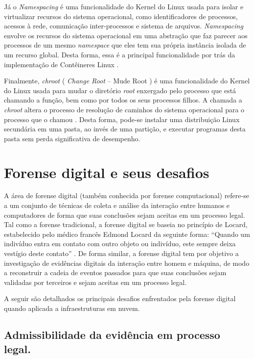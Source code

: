 Já o \textit{Namespacing} é uma funcionalidade do Kernel do Linux usada para isolar e virtualizar recursos do sistema operacional, como identificadores de processos, acessos à rede, comunicação inter-processos e sistema de arquivos.
%
\textit{Namespacing} envolve os recursos do sistema operacional em uma abstração que faz parecer aos processos de um mesmo \textit{namespace} que eles tem sua própria instância isolada de um recurso global.
%
Desta forma, essa é a principal funcionalidade por trás da implementação de Contêineres Linux \cite{UnixManPagesNamespacing}.


Finalmente, \textit{chroot} ( \textit{Change Root} -- Mude Root ) é uma funcionalidade do Kernel do Linux usada para mudar o diretório \textit{root} enxergado pelo processo que está chamando a função, bem como por todos os seus processos filhos. 
%
A chamada a \textit{chroot} altera o processo de resolução de caminhos do sistema operacional para o processo que o chamou \cite{UnixManPagesChRoot}.
%
Desta forma, pode-se instalar uma distribuição Linux secundária em uma pasta, ao invés de uma partição, e executar programas desta pasta sem perda significativa de desempenho.


\section{Forense digital e seus desafios}
\label{sec:forensedigital}


A área de forense digital (também conhecida por forense computacional) refere-se a um conjunto de técnicas de coleta e análise da interação entre humanos e computadores de forma que suas conclusões sejam aceitas em um processo legal.
%
Tal como a forense tradicional, a forense digital se baseia no princípio de Locard, estabelecido pelo médico francês Edmond Locard da seguinte forma: ``Quando um indivíduo entra em contato com outro objeto ou indivíduo, este sempre deixa vestígio deste contato'' \cite{Ramos:2011}.
%
De forma similar, a forense digital tem por objetivo a investigação de evidências digitais da interação entre homem e máquina, de modo a reconstruir a cadeia de eventos passados para que suas conclusões sejam validadas por terceiros e sejam aceitas em um processo legal.
 

A seguir são detalhados os principais desafios enfrentados pela forense digital quando aplicada a infraestruturas em nuvem.

\subsection{Admissibilidade da evidência em processo legal.}
\label{sec:credibilidadeaceitabilidadeevidencia}

